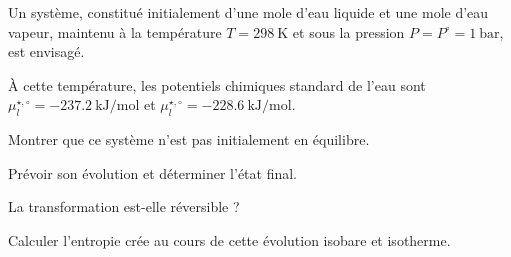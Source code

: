 \begin{exercise}

Un système, constitué initialement d'une mole d’eau liquide et une mole d’eau vapeur, maintenu à la température $T = 298 ~ \si{\kelvin}$ et sous la pression $P = P^\circ = 1 ~ \si{\bar}$, est envisagé. 

À cette température, les potentiels chimiques standard de l’eau sont $\mu_{l}^{\star, \circ} = - 237.2 ~ \si{\kilo\joule\per\mole}$ et $\mu_{l}^{\star, \circ} = -228.6 ~ \si{\kilo\joule\per\mole}$.

\begin{questions}
\question Montrer que ce système n'est pas initialement en équilibre.

\question Prévoir son évolution et déterminer l’état final.

\question La transformation est-elle réversible ?

\question Calculer l’entropie crée au cours de cette évolution isobare et isotherme.
\end{questions}

\end{exercise}